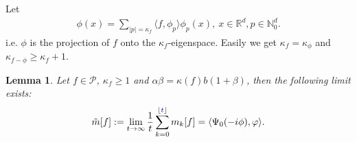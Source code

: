 \documentclass[12pt,oneside,english]{amsart}
\theoremstyle{plain}
\newtheorem{lem}[thm]{Lemma}
\theoremstyle{definition}
\numberwithin{equation}{section}
\newcommand{\added}[1]{{\color{blue}#1}}\newcommand{\deleted}[1]{{\color{red}#1}}
\begin{document}
Let
\begin{align}
    \phi(x)=\sum_{|p|=\kappa_f}\langle f, \phi_p\rangle\phi_p(x),~x\in \mathbb{R}^d, p \in\mathbb{N}_0^d.
\end{align}
i.e. $\phi$ is the projection of $f$ onto the $\kappa_f$-eigenspace. Easily we get $\kappa_f=\kappa_{\phi}$ and $\kappa_{f-\phi}\geq \kappa_f+1$.
\begin{lem}\label{lemma210}
Let $f \in \mathcal{P}$, $\kappa_f\geq 1$ and $\alpha\beta=\kappa(f)b(1+\beta)$, then the following limit exists:
\begin{align}
    \tilde{m}[f]:=\lim_{t\rightarrow \infty}\frac{1}{t}\sum_{k=0}^{\added{\lfloor t \rfloor}}m_k[f]=\langle\Psi_0(-i\phi),\varphi\rangle.
\end{align}
\end{lem}
\end{document}
